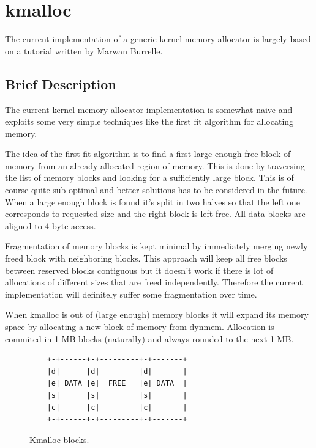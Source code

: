 \chapter{kmalloc}

The current implementation of a generic kernel memory allocator is largely
based on a tutorial written by Marwan Burrelle\cite{Burelle:malloc}.

\section{Brief Description}

The current kernel memory allocator implementation is somewhat naive and
exploits some very simple techniques like the first fit algorithm for allocating
memory.

The idea of the first fit algorithm is to find a first large enough free block
of memory from an already allocated region of memory. This is done by traversing
the list of memory blocks and looking for a sufficiently large block. This is
of course quite sub-optimal and better solutions has to be considered in the
future. When a large enough block is found it's split in two halves so that the
left one corresponds to requested size and the right block is left free. All data
blocks are aligned to 4 byte access.

Fragmentation of memory blocks is kept minimal by immediately merging newly freed
block with neighboring blocks. This approach will keep all free blocks between
reserved blocks contiguous but it doesn't work if there is lot of allocations of
different sizes that are freed independently. Therefore the current implementation
will definitely suffer some fragmentation over time.

When kmalloc is out of (large enough) memory blocks it will expand its memory
space by allocating a new block of memory from dynmem. Allocation is commited in
1 MB blocks (naturally) and always rounded to the next 1 MB.

\begin{figure}
\begin{verbatim}
    +-+------+-+---------+-+-------+
    |d|      |d|         |d|       |
    |e| DATA |e|  FREE   |e| DATA  |
    |s|      |s|         |s|       |
    |c|      |c|         |c|       |
    +-+------+-+---------+-+-------+
\end{verbatim}
\caption{Kmalloc blocks.}
\label{figure:kmalloc_blocks}
\end{figure}

